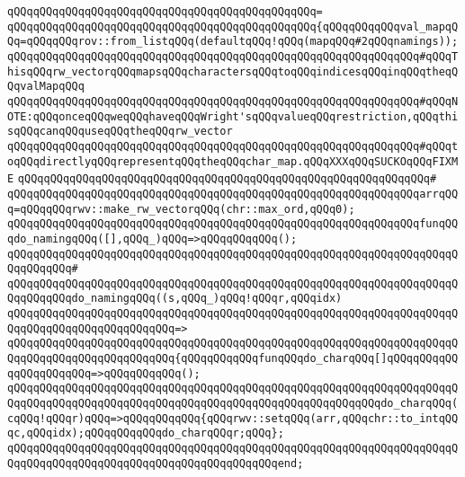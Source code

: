 \verb|qQQqqQQqqQQqqQQqqQQqqQQqqQQqqQQqqQQqqQQqqQQqqQQq=|\newline
\verb|qQQqqQQqqQQqqQQqqQQqqQQqqQQqqQQqqQQqqQQqqQQqqQQq{qQQqqQQqqQQqval_mapqQQq=qQQqqQQqrov::from_listqQQq(defaultqQQq!qQQq(mapqQQq#2qQQqnamings));|\newline
\newline
\verb|qQQqqQQqqQQqqQQqqQQqqQQqqQQqqQQqqQQqqQQqqQQqqQQqqQQqqQQqqQQqqQQq#qQQqThisqQQqrw_vectorqQQqmapsqQQqcharactersqQQqtoqQQqindicesqQQqinqQQqtheqQQqvalMapqQQq|\newline
\newline
\verb|qQQqqQQqqQQqqQQqqQQqqQQqqQQqqQQqqQQqqQQqqQQqqQQqqQQqqQQqqQQqqQQq#qQQqNOTE:qQQqonceqQQqweqQQqhaveqQQqWright'sqQQqvalueqQQqrestriction,qQQqthisqQQqcanqQQquseqQQqtheqQQqrw_vector|\newline
\verb|qQQqqQQqqQQqqQQqqQQqqQQqqQQqqQQqqQQqqQQqqQQqqQQqqQQqqQQqqQQqqQQq#qQQqtoqQQqdirectlyqQQqrepresentqQQqtheqQQqchar_map.qQQqXXXqQQqSUCKOqQQqFIXME|\newline
\verb|qQQqqQQqqQQqqQQqqQQqqQQqqQQqqQQqqQQqqQQqqQQqqQQqqQQqqQQqqQQqqQQq#|\newline
\verb|qQQqqQQqqQQqqQQqqQQqqQQqqQQqqQQqqQQqqQQqqQQqqQQqqQQqqQQqqQQqqQQqarrqQQq=qQQqqQQqrwv::make_rw_vectorqQQq(chr::max_ord,qQQq0);|\newline
\newline
\verb|qQQqqQQqqQQqqQQqqQQqqQQqqQQqqQQqqQQqqQQqqQQqqQQqqQQqqQQqqQQqqQQqfunqQQqdo_namingqQQq([],qQQq_)qQQq=>qQQqqQQqqQQq();|\newline
\verb|qQQqqQQqqQQqqQQqqQQqqQQqqQQqqQQqqQQqqQQqqQQqqQQqqQQqqQQqqQQqqQQqqQQqqQQqqQQqqQQq#|\newline
\verb|qQQqqQQqqQQqqQQqqQQqqQQqqQQqqQQqqQQqqQQqqQQqqQQqqQQqqQQqqQQqqQQqqQQqqQQqqQQqqQQqdo_namingqQQq((s,qQQq_)qQQq!qQQqr,qQQqidx)|\newline
\verb|qQQqqQQqqQQqqQQqqQQqqQQqqQQqqQQqqQQqqQQqqQQqqQQqqQQqqQQqqQQqqQQqqQQqqQQqqQQqqQQqqQQqqQQqqQQqqQQq=>|\newline
\verb|qQQqqQQqqQQqqQQqqQQqqQQqqQQqqQQqqQQqqQQqqQQqqQQqqQQqqQQqqQQqqQQqqQQqqQQqqQQqqQQqqQQqqQQqqQQqqQQq{qQQqqQQqqQQqfunqQQqdo_charqQQq[]qQQqqQQqqQQqqQQqqQQqqQQq=>qQQqqQQqqQQq();|\newline
\verb|qQQqqQQqqQQqqQQqqQQqqQQqqQQqqQQqqQQqqQQqqQQqqQQqqQQqqQQqqQQqqQQqqQQqqQQqqQQqqQQqqQQqqQQqqQQqqQQqqQQqqQQqqQQqqQQqqQQqqQQqqQQqqQQqdo_charqQQq(cqQQq!qQQqr)qQQq=>qQQqqQQqqQQq{qQQqrwv::setqQQq(arr,qQQqchr::to_intqQQqc,qQQqidx);qQQqqQQqqQQqdo_charqQQqr;qQQq};|\newline
\verb|qQQqqQQqqQQqqQQqqQQqqQQqqQQqqQQqqQQqqQQqqQQqqQQqqQQqqQQqqQQqqQQqqQQqqQQqqQQqqQQqqQQqqQQqqQQqqQQqqQQqqQQqqQQqqQQqend;|\newline
